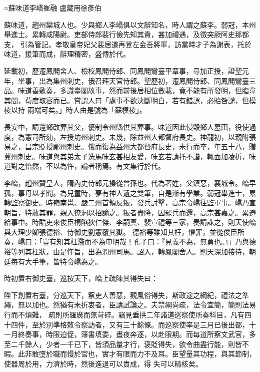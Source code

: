 
\begin{pinyinscope}

 ○蘇味道李嶠崔融
 盧藏用徐彥伯



 蘇味道，趙州欒城人也。少與鄉人李嶠俱以文辭知名，時人謂之蘇李。弱冠，本州舉進士。累轉咸陽尉。吏部侍郎裴行儉先知其貴，甚加禮遇，及徵突厥阿史那都支，
 引為管記。孝敬皇帝妃父裴居道再登左金吾將軍，訪當時才子為謝表，托於味道，援筆而成，辭理精密，盛傳於代。



 延載初，歷遷鳳閣舍人、檢校鳳閣侍郎、同鳳閣鸞臺平章事，尋加正授，證聖元年，坐事，出為集州刺史，俄召拜天官侍郎。聖歷初，遷鳳閣侍郎、同鳳閣鸞臺三品。味道善敷奏，多識臺閣故事，然而前後居相位數載，竟不能有所發明，但脂韋其間，茍度取容而已。嘗謂人曰「處事不欲決斷明白，若有錯誤，必貽咎譴，但模棱以持
 兩端可矣。」時人由是號為「蘇模棱」。



 長安中，請還鄉改葬其父，優制令州縣供其葬事。味道因此侵毀鄉人墓田，役使過度，為憲司所劾，左授坊州刺史。未幾，除益州大都督府長史。神龍初，以親附張易之，昌宗貶授郿州剌史。俄而復為益州大都督府長史，未行而卒，年五十八，贈冀州刺史。味道與其弟太子洗馬味玄甚相友愛，味玄若請托不諧，輒面加凌折，味道對之怡然，不以為忤，論者稱焉。有文集行於代。



 李嶠，趙州贊皇人，隋內史侍郎元操從曾孫也。代為著姓，父鎮惡，襄城令。嶠早孤，事母以孝聞。為兒童時，夢有神人遺之雙筆，自是漸有學業。弱冠舉進士，累轉監察御史。時嶺南邕、嚴二州首領反叛，發兵討擊，高宗令嶠往監軍事。嶠乃宣朝旨，特赦其罪，親入獠洞以招諭之。叛者盡降，因罷兵而還，高宗甚嘉之。累遷給事中。時酷吏來俊臣構陷狄仁傑、李嗣真、裴宣禮等三家，奏請誅之，則天使嶠與大理少卿張德裕、侍御史劉憲覆其獄。
 德裕等雖知其枉，懼罪，並從俊臣所奏，嶠曰：「豈有知其枉濫而不為申明哉！孔子曰：『見義不為，無勇也。』」乃與德裕等列其枉狀，由是忤旨，出為潤州司馬。詔入，轉鳳閣舍人。則天深加接待，朝廷每有大手筆，皆特令嶠為之。



 時初置右御史臺，巡按天下，嶠上疏陳其得失曰：



 陛下創置右臺，分巡天下，察吏人善惡，觀風俗得失，斯政途之綱紀，禮法之準繩，無以加也。然猶有未折衷者，臣請試論之。夫禁綱尚疏，法令宜簡，簡則法易行而不煩雜，
 疏則所羅廣而無苛碎。竊見垂拱二年諸道巡察使所奏科目，凡有四十四件，至於別準格敕令察訪者，又有三十餘條。而巡察使率是三月已後出都，十一月終奏事，時限迫促，簿書填委，晝夜奔逐，以赴限期。而每道所察文武官，多至二千餘人，少者一千已下，皆須品量才行，褒貶得失，欲令曲盡行能，則皆不暇。此非敢墮於職而慢於官也，實才有限而力不及耳。臣望量其功程，與其節制，使器周於用，力濟於時，然後進退可以責成，得
 失可以精核矣。




\end{pinyinscope}
